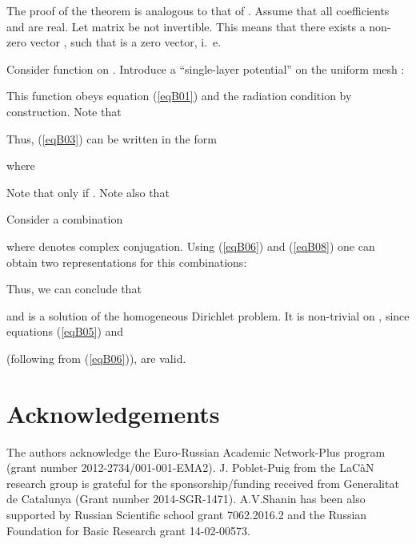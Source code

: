 \documentclass[12pt]{article}
\begin{document}
The proof of the theorem is analogous to that of \cite{poblet-PVS:2014}.
Assume that all coefficients  and  are real.
Let matrix  be not invertible.
This means that there exists a non-zero vector ,  such that  is a zero vector,
i.\ e.

Consider function  on  . Introduce a ``single-layer potential''
on the uniform mesh :

This function obeys equation (\ref{eqB01}) and the radiation condition by construction.
Note that

Thus, (\ref{eqB03}) can be written in the form

where

Note that
 only if .
Note also that


Consider a combination

where  denotes complex conjugation. Using (\ref{eqB06}) and (\ref{eqB08}) one can obtain
two representations for this combinations:

Thus, we can conclude that

and  is a solution of the homogeneous Dirichlet problem. It is non-trivial on ,
since equations (\ref{eqB05}) and

(following from (\ref{eqB06})), are valid.

\section*{Acknowledgements}
The authors acknowledge the Euro-Russian Academic Network-Plus program (grant number 2012-2734/001-001-EMA2). J. Poblet-Puig from the LaC\`{a}N research group is grateful for the sponsorship/funding received from Generalitat de Catalunya (Grant number 2014-SGR-1471).
A.V.Shanin has been also supported by Russian Scientific school grant 7062.2016.2 and the Russian Foundation for Basic Research grant 14-02-00573.



\end{document}
